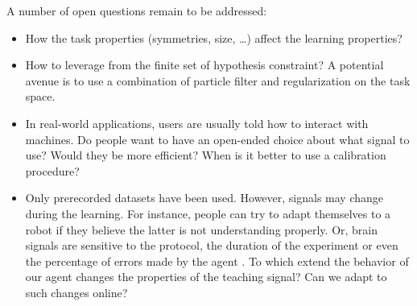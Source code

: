 
A number of open questions remain to be addressed:
\begin{itemize}

\item How the task properties (symmetries, size, \ldots) affect the learning properties?

\item How to leverage from the finite set of hypothesis constraint? A potential avenue is to use a combination of particle filter and regularization on the task space.



\item In real-world applications, users are usually told how to interact with machines. Do people want to have an open-ended choice about what signal to use? Would they be more efficient? When is it better to use a calibration procedure?

\item Only prerecorded datasets have been used. However, signals may change during the learning. For instance, people can try to adapt themselves to a robot if they believe the latter is not understanding properly. Or, brain signals are sensitive to the protocol, the duration of the experiment or even the percentage of errors made by the agent \cite{chavarriaga2010learning}. To which extend the behavior of our agent changes the properties of the teaching signal? Can we adapt to such changes online? 
\end{itemize}


